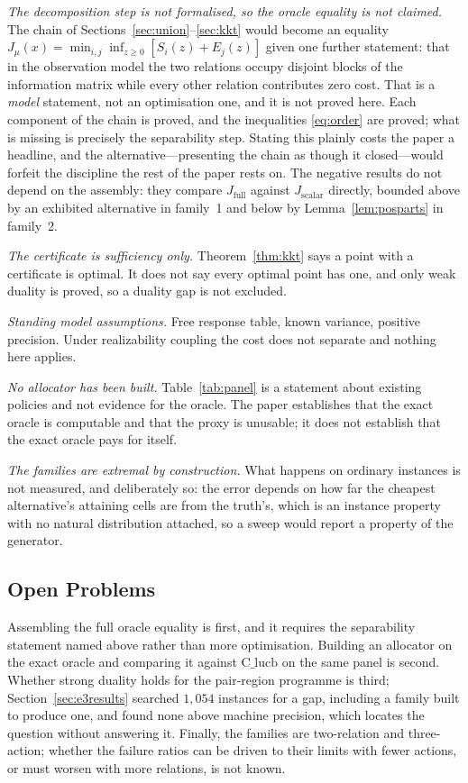 \emph{The decomposition step is not formalised, so the oracle equality is not claimed.} The
chain of Sections~\ref{sec:union}--\ref{sec:kkt} would become an equality
$J_{\mu}(x)=\min_{i,j}\inf_{z\ge0}[S_{i}(z)+E_{j}(z)]$ given one further statement: that in
the observation model the two relations occupy disjoint blocks of the information matrix
while every other relation contributes zero cost. That is a \emph{model} statement, not an
optimisation one, and it is not proved here. Each component of the chain is proved, and the
inequalities \eqref{eq:order} are proved; what is missing is precisely the separability step.
Stating this plainly costs the paper a headline, and the alternative---presenting the chain as
though it closed---would forfeit the discipline the rest of the paper rests on. The negative
results do not depend on the assembly: they compare $J_{\mathrm{full}}$ against
$J_{\mathrm{scalar}}$ directly, bounded above by an exhibited alternative in family~1 and
below by Lemma~\ref{lem:posparts} in family~2.

\emph{The certificate is sufficiency only.} Theorem~\ref{thm:kkt} says a point with a
certificate is optimal. It does not say every optimal point has one, and only weak duality is
proved, so a duality gap is not excluded.

\emph{Standing model assumptions.} Free response table, known variance, positive precision.
Under realizability coupling the cost does not separate and nothing here applies.

\emph{No allocator has been built.} Table~\ref{tab:panel} is a statement about existing
policies and not evidence for the oracle. The paper establishes that the exact oracle is
computable and that the proxy is unusable; it does not establish that the exact oracle pays
for itself.

\emph{The families are extremal by construction.} What happens on ordinary instances is not
measured, and deliberately so: the error depends on how far the cheapest alternative's
attaining cells are from the truth's, which is an instance property with no natural
distribution attached, so a sweep would report a property of the generator.

\subsection{Open Problems}

Assembling the full oracle equality is first, and it requires the separability statement named
above rather than more optimisation. Building an allocator on the exact oracle and comparing
it against $\mathrm{C\_lucb}$ on the same panel is second. Whether strong duality holds for
the pair-region programme is third; Section~\ref{sec:e3results} searched $1{,}054$ instances
for a gap, including a family built to produce one, and found none above machine precision,
which locates the question without answering it. Finally, the families are two-relation and three-action;
whether the failure ratios can be driven to their limits with fewer actions, or must worsen
with more relations, is not known.

